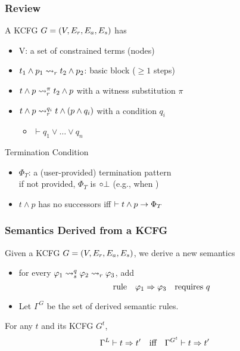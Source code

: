 \documentclass{beamer}
\begin{document}
\begin{frame}
\frametitle{Review}
A KCFG $G = (V, E_r, E_a, E_s)$ has
\begin{itemize}
\item V: a set of constrained terms (nodes)
\item $t_1 \land p_1 \rightsquigarrow_r t_2 \land p_2$: 
      basic block ($\ge 1$ steps)
\item $t \land p \rightsquigarrow_r^\pi t_2 \land p$ with a witness substitution $\pi$
\item $t \land p \rightsquigarrow_r^{q_i} t \land (p \land q_i)$ with a condition $q_i$
\begin{itemize}
\item $\vdash q_1 \lor \dots \lor q_n$
\end{itemize}
\end{itemize}
Termination Condition
\begin{itemize}
\item $\Phi_T$: a (user-provided) termination pattern\\
if not provided, $\Phi_T$ is $\mathord{\circ} \bot$ (e.g., when )
\item $t \land p$ has no successors iff $\vdash t \land p \rightarrow \Phi_T$
\end{itemize}
\end{frame}

\begin{frame}
\frametitle{Semantics Derived from a KCFG}
Given a KCFG $G = (V, E_r, E_a, E_s)$, we derive a new semantics
\begin{itemize}
\item for every $\varphi_1 \rightsquigarrow_s^{q} \varphi_2 \rightsquigarrow_r \varphi_3$, add
      \[ \text{rule} \quad \varphi_1 \Rightarrow \varphi_3 \quad \text{requires} \  q\]
\item Let $\Gamma^G$ be the set of derived semantic rules.
\end{itemize}
\begin{theorem}
For any $t$ and its KCFG $G^t$, 
\[\Gamma^L \vdash t \Rightarrow t' \quad\text{iff}\quad
  \Gamma^{G^t} \vdash t \Rightarrow t'\]
\end{theorem}
\end{frame}
\end{document}
